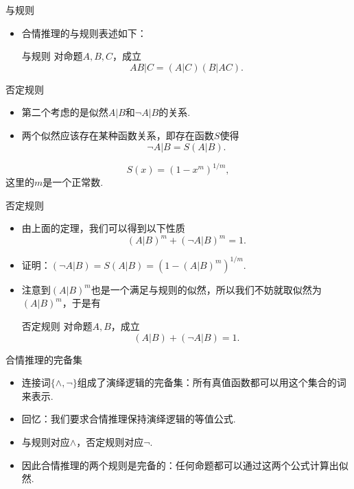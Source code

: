 {与规则}
\begin{itemize}
    \item 合情推理的与规则表述如下：
    \begin{center}{与规则}
    对命题$A,B,C$，成立
    \[AB|C=(A|C)(B|AC).\]
    \end{center}
\end{itemize}



{否定规则}
\begin{itemize}
    \item 第二个考虑的是似然$A|B$和$\neg A|B$的关系.
    \item 两个似然应该存在某种函数关系，即存在函数$S$使得
    \[\neg A|B=S(A|B).\]
    \end{itemize}
    \begin{theorem}
        \begin{equation*}
            S(x) = (1 - x^m)^{1/m},
        \end{equation*}
        这里的$m$是一个正常数.
    \end{theorem}


{否定规则}
\begin{itemize}
    \item 由上面的定理，我们可以得到以下性质
    \begin{equation*}
        (A|B)^m + (\neg A|B)^m = 1.
    \end{equation*}
    \item 证明：$(\neg A|B) = S(A|B) = (1 - (A|B)^m)^{1/m}$.
    \item 注意到$(A|B)^m$也是一个满足与规则的似然，所以我们不妨就取似然为$(A|B)^m$，于是有
    \begin{center}{否定规则}
    对命题$A,B$，成立
    \[(A|B) + (\neg A|B) = 1.\]
    \end{center}
\end{itemize}


{合情推理的完备集}
\begin{itemize}
    \item 连接词$\{\wedge,\neg\}$组成了演绎逻辑的完备集：所有真值函数都可以用这个集合的词来表示.
    \item 回忆：我们要求合情推理保持演绎逻辑的等值公式.
    \item 与规则对应$\wedge$，否定规则对应$\neg$.
    \item 因此合情推理的两个规则是完备的：任何命题都可以通过这两个公式计算出似然.
\end{itemize}


